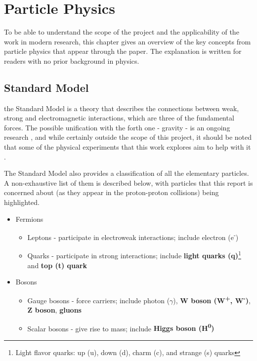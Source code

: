\section{Particle Physics}
To be able to understand the scope of the project and the applicability of the work in modern research, this chapter gives an overview of the key concepts from particle physics that appear through the paper. The explanation is written for readers with no prior background in physics.

\subsection{Standard Model}
the Standard Model is a theory that describes the connections between weak, strong and electromagnetic interactions, which are three of the fundamental forces. The possible unification with the forth one - gravity - is an ongoing research \cite{67-krasnov2018gravity}, and while certainly outside the scope of this project, it should be noted that some of the physical experiments that this work explores aim to help with it \cite{68-walz2015gbar,69-pagano2020gravity}.

The Standard Model also provides a classification of all the elementary particles. A non-exhaustive list of them is described below, with particles that this report is concerned about (as they appear in the proton-proton collisions) being highlighted.

\begin{itemize}[leftmargin=7mm]
  \item Fermions
  \begin{itemize}[leftmargin=5mm]
    \item Leptons - participate in electroweak interactions; include electron (e\textsuperscript{-})
    \item Quarks - participate in strong interactions; include \textbf{light quarks (q)}\footnote{Light flavor quarks: up (u), down (d), charm (c), and strange (s) quarks} and \textbf{top (t) quark}
  \end{itemize}
  \item Bosons
  \begin{itemize}[leftmargin=5mm]
    \item Gauge bosons - force carriers; include photon ($\gamma$), \textbf{W boson (W\textsuperscript{+}, W\textsuperscript{-})}, \textbf{Z boson}, \textbf{gluons}
    \item Scalar bosons - give rise to mass; include \textbf{Higgs boson (H\textsuperscript{0})}
  \end{itemize}
\end{itemize}


